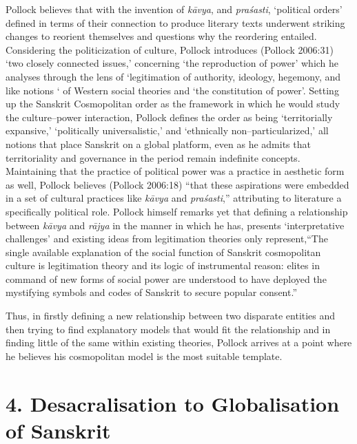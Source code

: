 Pollock believes that with the invention of \textit{kāvya}, and \textit{praśasti}, ‘political orders’ defined in terms of their connection to produce literary texts underwent striking changes to reorient themselves and questions why the reordering entailed. Considering the politicization of culture, Pollock introduces (Pollock 2006:31) ‘two closely connected issues,’ concerning ‘the reproduction of power’ which he analyses through the lens of ‘legitimation of authority, ideology, hegemony, and like notions ‘ of Western social theories and ‘the constitution of power’. Setting up the Sanskrit Cosmopolitan order as the framework in which he would study the culture–power interaction, Pollock defines the order as being ‘territorially expansive,’ ‘politically universalistic,’ and ‘ethnically non–particularized,’ all notions that place Sanskrit on a global platform, even as he admits that territoriality and governance in the period remain indefinite concepts. Maintaining that the practice of political power was a practice in aesthetic form as well, Pollock believes (Pollock 2006:18) “that these aspirations were embedded in a set of cultural practices like \textit{kāvya} and \textit{praśasti},” attributing to literature a specifically political role. Pollock himself remarks yet that defining a relationship between \textit{kāvya} and \textit{rājya} in the manner in which he has, presents ‘interpretative challenges’ and existing ideas from legitimation theories only represent,“The single available explanation of the social function of Sanskrit cosmopolitan culture is legitimation theory and its logic of instrumental reason: elites in command of new forms of social power are understood to have deployed the mystifying symbols and codes of Sanskrit to secure popular consent.”

Thus, in firstly defining a new relationship between two disparate entities and then trying to find explanatory models that would fit the relationship and in finding little of the same within existing theories, Pollock arrives at a point where he believes his cosmopolitan model is the most suitable template.


\section*{4. Desacralisation to Globalisation of Sanskrit}

